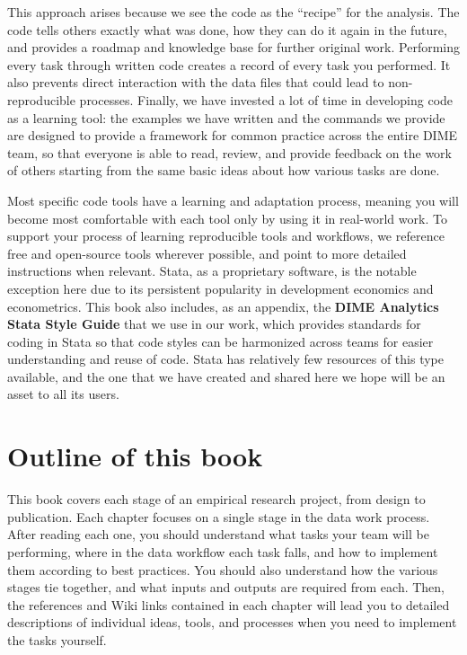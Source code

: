 This approach arises because we see the code as the ``recipe'' for the analysis.
The code tells others exactly what was done,
how they can do it again in the future,
and provides a roadmap and knowledge base for further original work.\cite{hamermesh2007replication}
Performing every task through written code
creates a record of every task you performed.\cite{ozier2019replication}
It also prevents direct interaction
with the data files that could lead to non-reproducible processes.\cite{chang2015economics}
Finally, we have invested a lot of time in developing code as a learning tool:
the examples we have written and the commands we provide
are designed to provide a framework for common practice
across the entire DIME team, so that everyone is able to
read, review, and provide feedback on the work of others
starting from the same basic ideas about how various tasks are done.

Most specific code tools have a learning and adaptation process,
meaning you will become most comfortable with each tool
only by using it in real-world work.
To support your process of learning reproducible tools and workflows,
we reference free and open-source tools wherever possible,
and point to more detailed instructions when relevant.
Stata, as a proprietary software, is the notable exception here
due to its persistent popularity in development economics and econometrics.
This book also includes, as an appendix,
the \textbf{DIME Analytics Stata Style Guide}
that we use in our work, which provides
standards for coding in Stata so that code styles
can be harmonized across teams for easier understanding and reuse of code.
Stata has relatively few resources of this type available,
and the one that we have created and shared here
we hope will be an asset to all its users.

\section{Outline of this book}

This book covers each stage of an empirical research project, from design to publication.
Each chapter focuses on a single stage in the data work process.
After reading each one, you should understand
what tasks your team will be performing,
where in the data workflow each task falls,
and how to implement them according to best practices.
You should also understand how the various stages tie together,
and what inputs and outputs are required from each.
Then, the references and Wiki links contained in each chapter
will lead you to detailed descriptions of individual
ideas, tools, and processes when you need to implement the tasks yourself.

